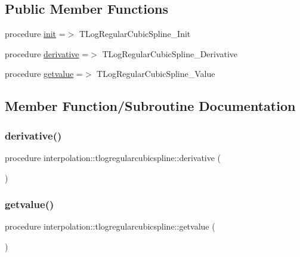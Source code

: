 \subsection*{Public Member Functions}
\begin{DoxyCompactItemize}
\item 
procedure \mbox{\hyperlink{structinterpolation_1_1tlogregularcubicspline_a7032c8ee075d13665a2ef0fc9f6207da}{init}} =$>$ T\+Log\+Regular\+Cubic\+Spline\+\_\+\+Init
\item 
procedure \mbox{\hyperlink{structinterpolation_1_1tlogregularcubicspline_a590ed9bf0dc098539fb0b4b4003e8a2d}{derivative}} =$>$ T\+Log\+Regular\+Cubic\+Spline\+\_\+\+Derivative
\item 
procedure \mbox{\hyperlink{structinterpolation_1_1tlogregularcubicspline_a66c2180fabacf43694e138b5ebfb45ff}{getvalue}} =$>$ T\+Log\+Regular\+Cubic\+Spline\+\_\+\+Value
\end{DoxyCompactItemize}


\subsection{Member Function/\+Subroutine Documentation}
\mbox{\label{structinterpolation_1_1tlogregularcubicspline_a590ed9bf0dc098539fb0b4b4003e8a2d}} 
\subsubsection{\texorpdfstring{derivative()}{derivative()}}
{\footnotesize\ttfamily procedure interpolation\+::tlogregularcubicspline\+::derivative (\begin{DoxyParamCaption}{ }\end{DoxyParamCaption})}

\mbox{\label{structinterpolation_1_1tlogregularcubicspline_a66c2180fabacf43694e138b5ebfb45ff}} 
\subsubsection{\texorpdfstring{getvalue()}{getvalue()}}
{\footnotesize\ttfamily procedure interpolation\+::tlogregularcubicspline\+::getvalue (\begin{DoxyParamCaption}{ }\end{DoxyParamCaption})}

